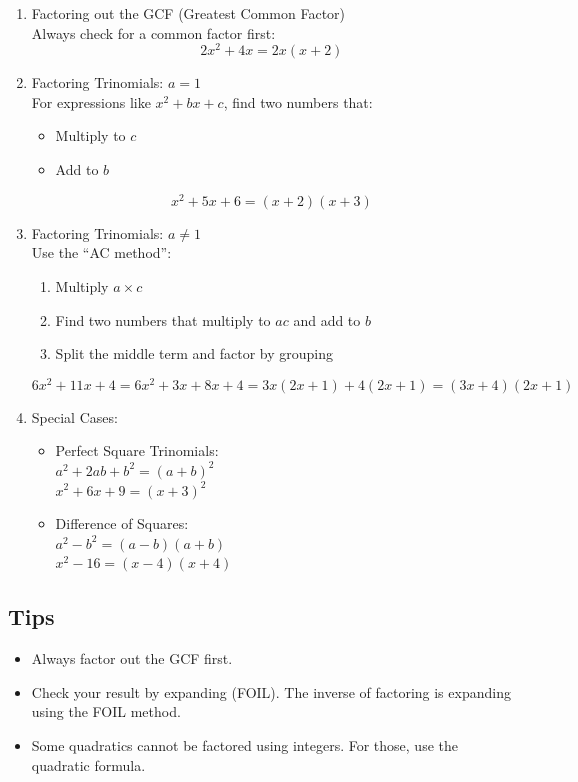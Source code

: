 \begin{enumerate}
  \item Factoring out the GCF (Greatest Common Factor) \\
  Always check for a common factor first:
  \[
  2x^2 + 4x = 2x(x + 2)
  \]

  \item Factoring Trinomials: \( a = 1 \) \\
  For expressions like \( x^2 + bx + c \), find two numbers that:
  \begin{itemize}
    \item Multiply to \( c \)
    \item Add to \( b \)
  \end{itemize}
  \[
  x^2 + 5x + 6 = (x + 2)(x + 3)
  \]

  \item Factoring Trinomials: \( a \neq 1 \) \\
  Use the ``AC method'':
  \begin{enumerate}
    \item Multiply \( a \times c \)
    \item Find two numbers that multiply to \( ac \) and add to \( b \)
    \item Split the middle term and factor by grouping
  \end{enumerate}
  \[
  6x^2 + 11x + 4 = 6x^2 + 3x + 8x + 4 = 3x(2x + 1) + 4(2x + 1) = (3x + 4)(2x + 1)
  \]

  \item Special Cases:
  \begin{itemize}
    \item Perfect Square Trinomials: \\
    \( a^2 + 2ab + b^2 = (a + b)^2 \) \\
    \( x^2 + 6x + 9 = (x + 3)^2 \)

    \item {}Difference of Squares: \\
    \( a^2 - b^2 = (a - b)(a + b) \) \\
    \( x^2 - 16 = (x - 4)(x + 4) \)
  \end{itemize}
\end{enumerate}

\subsection*{Tips}
\begin{itemize}
  \item Always factor out the GCF first.
  \item Check your result by expanding (FOIL). The inverse of factoring is expanding using the FOIL method.
  \item Some quadratics cannot be factored using integers. For those, use the quadratic formula.
\end{itemize}



